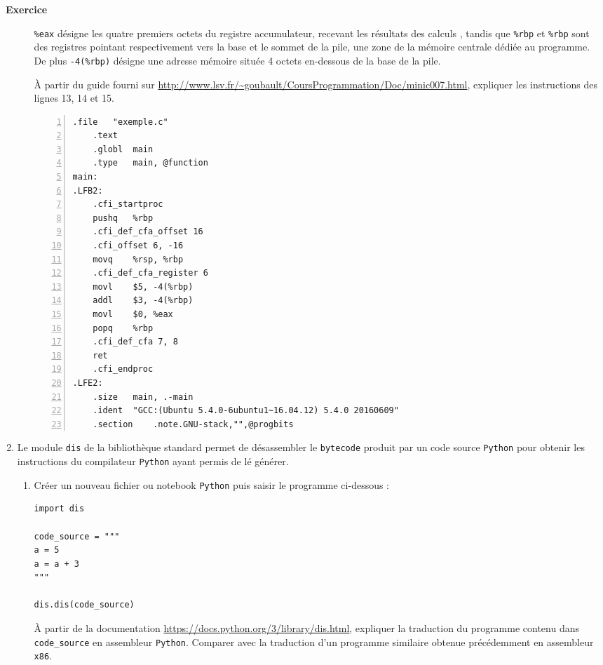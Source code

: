 \documentclass[a4paper, french, 11pt]{article}  %
\newcounter{def}
\newcounter{exercice}
\newenvironment{exercice}[1]
{\par \medskip   \addtocounter{exercice}{1} \noindent  
\begin{bclogo}[arrondi =0.1,   noborder = true, logo=\bccrayon, marge=4]{~\textbf{Exercice} \textbf{\theexercice} {\itshape #1} }  \par}
{
\end{bclogo}
 \par \bigskip }
\newcounter{prog}
\begin{document}
\begin{exercice}{}
\begin{enumerate}
\begin{enumerate}
\verb+%eax+ désigne les quatre premiers octets du registre accumulateur, recevant les résultats des calculs , tandis que \verb+%rbp+ et \verb+%rbp+  sont des registres pointant respectivement vers la base et le sommet de la pile, une zone de la mémoire centrale dédiée au programme.  De plus \verb+-4(%rbp)+ désigne une adresse mémoire située 4 octets en-dessous de  la base de la pile.

À partir du guide fourni sur \url{http://www.lsv.fr/~goubault/CoursProgrammation/Doc/minic007.html}, expliquer les instructions des lignes 13, 14 et 15.


\begin{lstlisting}[numbers=left, language={[x86masm]Assembler}]
	.file	"exemple.c"
	.text
	.globl	main
	.type	main, @function
main:
.LFB2:
	.cfi_startproc
	pushq	%rbp
	.cfi_def_cfa_offset 16
	.cfi_offset 6, -16
	movq	%rsp, %rbp
	.cfi_def_cfa_register 6
	movl	$5, -4(%rbp)
	addl	$3, -4(%rbp)
	movl	$0, %eax
	popq	%rbp
	.cfi_def_cfa 7, 8
	ret
	.cfi_endproc
.LFE2:
	.size	main, .-main
	.ident	"GCC:(Ubuntu 5.4.0-6ubuntu1~16.04.12) 5.4.0 20160609"
	.section	.note.GNU-stack,"",@progbits
\end{lstlisting}

\end{enumerate}

\item 




Le module \texttt{dis} de la bibliothèque standard  permet de désassembler le \texttt{bytecode} produit par un code source \texttt{Python} pour obtenir les instructions du compilateur \texttt{Python} ayant permis de lé générer.

\begin{enumerate}
\item Créer un nouveau fichier ou notebook \texttt{Python} puis saisir le programme ci-dessous :

\begin{lstlisting}[style=rond]
import dis 

code_source = """
a = 5
a = a + 3
"""

dis.dis(code_source)
\end{lstlisting}

À partir de la documentation \url{https://docs.python.org/3/library/dis.html}, expliquer la traduction du programme contenu dans \verb+code_source+ en assembleur \texttt{Python}. Comparer avec la traduction d'un programme similaire obtenue précédemment  en assembleur \texttt{x86}.


\end{enumerate}
\end{enumerate}
\end{exercice}
\end{document}
